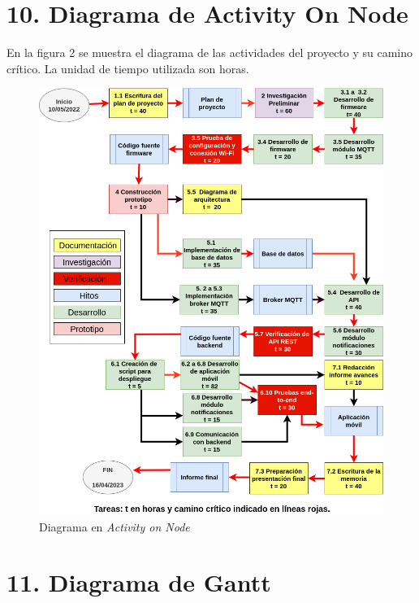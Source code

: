 \documentclass[
11pt, %
codirector, %
]{charter}
\begin{document}
\section{10. Diagrama de Activity On Node}
\label{sec:AoN}

En la figura 2 se muestra el diagrama de las actividades del proyecto y su camino crítico. La unidad de tiempo utilizada son horas.
\begin{figure}[htpb]
\centering 
\includegraphics[width=.8\textwidth]{./Figuras/AoN.png}
\caption{Diagrama en \textit{Activity on Node}}
\label{fig:AoN}
\end{figure}




\pagebreak
\section{11. Diagrama de Gantt}
\label{sec:gantt}
\end{document}
